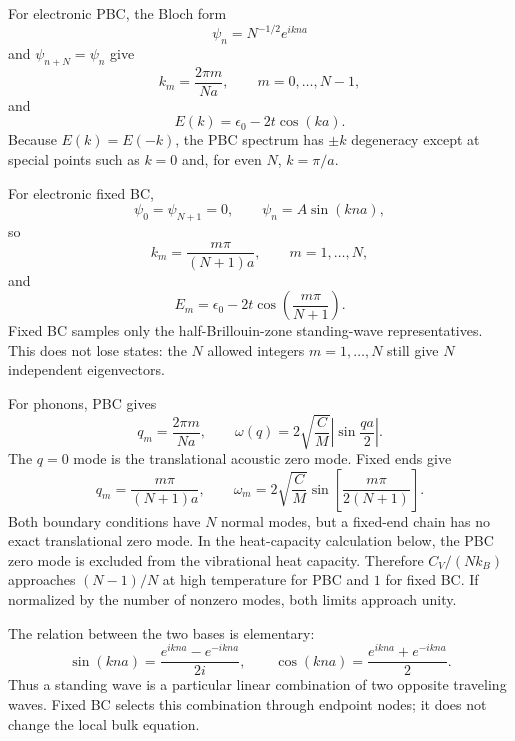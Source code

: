 ﻿\documentclass[a4paper,aps,prb,reprint,floatfix,nofootinbib,longbibliography]{revtex4-2}
\begin{document}
For electronic PBC, the Bloch form
\begin{equation}
\psi_n=N^{-1/2}e^{ikna}
\end{equation}
and \(\psi_{n+N}=\psi_n\) give
\begin{equation}
k_m=\frac{2\pi m}{Na},\qquad m=0,\ldots,N-1,
\end{equation}
and
\begin{equation}
E(k)=\epsilon_0-2t\cos(ka).
\end{equation}
Because \(E(k)=E(-k)\), the PBC spectrum has \(\pm k\) degeneracy except at special points such as \(k=0\) and, for even \(N\), \(k=\pi/a\).

For electronic fixed BC,
\begin{equation}
\psi_0=\psi_{N+1}=0,\qquad \psi_n=A\sin(kna),
\end{equation}
so
\begin{equation}
k_m=\frac{m\pi}{(N+1)a},\qquad m=1,\ldots,N,
\end{equation}
and
\begin{equation}
E_m=\epsilon_0-2t\cos\left(\frac{m\pi}{N+1}\right).
\end{equation}
Fixed BC samples only the half-Brillouin-zone standing-wave representatives.  This does not lose states: the \(N\) allowed integers \(m=1,\ldots,N\) still give \(N\) independent eigenvectors.

For phonons, PBC gives
\begin{equation}
q_m=\frac{2\pi m}{Na},\qquad
\omega(q)=2\sqrt{\frac{C}{M}}\left|\sin\frac{qa}{2}\right|.
\end{equation}
The \(q=0\) mode is the translational acoustic zero mode.  Fixed ends give
\begin{equation}
q_m=\frac{m\pi}{(N+1)a},\qquad
\omega_m=2\sqrt{\frac{C}{M}}\sin\left[\frac{m\pi}{2(N+1)}\right].
\end{equation}
Both boundary conditions have \(N\) normal modes, but a fixed-end chain has no exact translational zero mode.  In the heat-capacity calculation below, the PBC zero mode is excluded from the vibrational heat capacity.  Therefore \(C_V/(Nk_B)\) approaches \((N-1)/N\) at high temperature for PBC and \(1\) for fixed BC.  If normalized by the number of nonzero modes, both limits approach unity.

The relation between the two bases is elementary:
\begin{equation}
\sin(kna)=\frac{e^{ikna}-e^{-ikna}}{2i},\qquad
\cos(kna)=\frac{e^{ikna}+e^{-ikna}}{2}.
\end{equation}
Thus a standing wave is a particular linear combination of two opposite traveling waves.  Fixed BC selects this combination through endpoint nodes; it does not change the local bulk equation.
\end{document}
